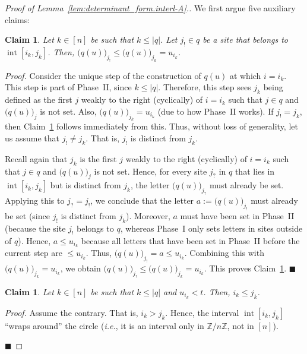 \documentclass[reqno]{amsart}
\newcommand{\0}{\phantom{c}}
\DeclareMathOperator{\inter}{int} %
\newcommand{\ZZ}{\mathbb{Z}}
\newenvironment{subproof}{\textit{Proof.} }{\hfill$\blacksquare$ \medskip}
\newcommand{\abs}[1]{\left| #1 \right|}
\newcommand{\ive}[1]{\left[ #1 \right]}
\theoremstyle{plain}
\newtheorem{claim}[thm]{Claim}
\theoremstyle{definition}
\numberwithin{equation}{section}
\begin{document}
\begin{proof}[Proof of Lemma~\ref{lem:determinant_form.interl-A}.]
We first argue five auxiliary claims:

\begin{claim}
\label{claim:little_interlacing}
Let $k\in \ive{n} $ be such that $k\leq \abs{q}$.
Let $j_{!} \in q$ be a site that belongs to $\inter[i_k, j_k]$.
Then, $\bigl( q(u) \bigr)_{j_{!}} \leq \bigl( q(u) \bigr)_{j_k} = u_{i_k}$.
\end{claim}

\begin{subproof}
Consider the unique step of the construction of $q(u)$ at which $i = i_k$.
This step is part of Phase~II, since $k \leq \abs{q}$.
Therefore, this step sees $j_k$ being defined as the first $j$ weakly to the right (cyclically) of $i = i_k$ such that $j \in q$ and $\bigl( q(u) \bigr)_j$ is not set.
Also, $\bigl( q(u) \bigr)_{j_k} = u_{i_k}$ (due to how Phase~II works).
If $j_{!} = j_k$, then Claim~\ref{claim:little_interlacing} follows immediately from this.
Thus, without loss of generality, let us assume that $j_{!} \neq j_k$.
That is, $j_{!}$ is distinct from $j_k$.

Recall again that $j_k$ is the first $j$ weakly to the right (cyclically) of $i = i_k$ such that $j \in q$ and $\bigl( q(u) \bigr)_j$ is not set.
Hence, for every site $j_{?}$ in $q$ that lies in $\inter[i_k, j_k]$ but is distinct from $j_k$, the letter $\bigl( q(u) \bigr)_{j_{?}}$ must already be set.
Applying this to $j_{?} = j_{!}$, we conclude that the letter $a := \bigl( q(u) \bigr)_{j_{!}}$ must already be set (since $j_{!}$ is distinct from $j_k$).
Moreover, $a$ must have been set in Phase~II (because the site $j_{!}$ belongs to $q$, whereas Phase~I only sets letters in sites outside of $q$).
Hence, $a \leq u_{i_k}$ because all letters that have been set in Phase~II before the current step are $\leq u_{i_k}$.
Thus, $\bigl( q(u) \bigr)_{j_{!}} = a \leq u_{i_k}$.
Combining this with $\bigl( q(u) \bigr)_{j_k} = u_{i_k}$, we obtain $\bigl( q(u) \bigr)_{j_{!}} \leq \bigl( q(u) \bigr)_{j_k}=u_{i_k}$.
This proves Claim~\ref{claim:little_interlacing}.
\end{subproof}

\begin{claim}
\label{claim:fixed_k_decreasing_i_from_j}
Let $k\in \ive{n} $ be such that $k\leq \abs{q}$ and $u_{i_k} < t$.
Then, $i_k \leq j_k$.
\end{claim}

\begin{subproof}
Assume the contrary. That is, $i_k>j_k$.
Hence, the interval $\inter[i_k, j_k]$ ``wraps around'' the circle (\textit{i.e.}, it is an interval only in $\ZZ/n\ZZ$, not in $\ive{n} $).


\end{subproof}
\end{proof}
\end{document}
